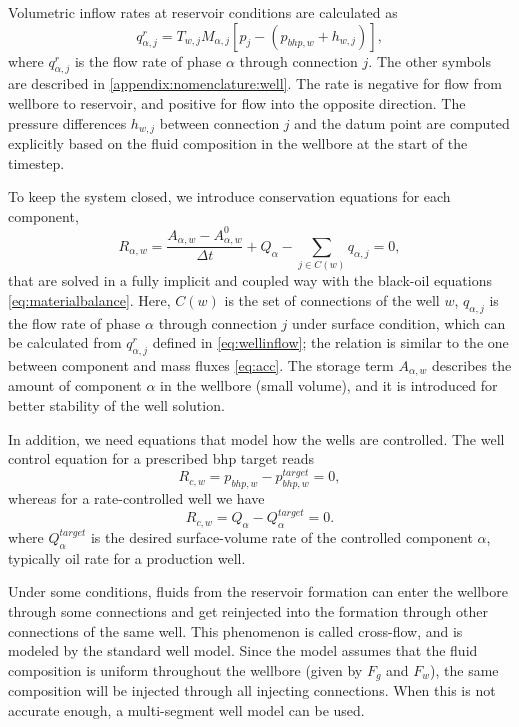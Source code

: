 Volumetric inflow rates at reservoir conditions are calculated as
\begin{equation}
q_{\alpha,j}^r = T_{w,j} M_{\alpha,j} [p_j - (p_{bhp,w} + h_{w,j})],
\label{eq:wellinflow}
\end{equation} 
where $q_{\alpha,j}^r$ is the flow rate of phase $\alpha$ through connection $j$. The
other symbols are described in \ref{appendix:nomenclature:well}.  The rate
is negative for flow from wellbore to reservoir, and positive for flow
into the opposite direction. The pressure differences $h_{w,j}$ between connection $j$ and
the datum point are computed explicitly based on the fluid composition in the wellbore at
the start of the timestep.

To keep the system closed, we introduce conservation equations for each component,
\begin{equation}
  \label{eq:conseq-swell}
R_{\alpha, w} = \frac{A_{\alpha, w} - A_{\alpha, w}^0}{\Delta t}  + Q_\alpha - \sum_{j\in C(w)} q_{\alpha, j} = 0,
\end{equation}
that are solved in a fully implicit and coupled way with the black-oil equations
\eqref{eq:materialbalance}.  Here, $C(w)$ is the set of connections of
the well $w$, $q_{\alpha,j}$ is the flow rate of phase $\alpha$
through connection $j$ under surface condition, which can be calculated from
$q_{\alpha,j}^r$ defined in \eqref{eq:wellinflow}; the relation is similar to the one
between component and mass fluxes \eqref{eq:acc}. The storage term $A_{\alpha, w}$
describes the amount of component $\alpha$ in the wellbore (small volume), and it is
introduced for better stability of the well solution.

In addition, we need equations that model how the wells are controlled.  The well control
{\revised equation for a prescribed bhp target reads}
\begin{equation}\label{eq:well-control-bhp}
R_{c, w} = p_{bhp, w} - p_{bhp, w}^{target} = 0,
\end{equation}
whereas for a rate-controlled well we have
\begin{equation}\label{eq:well-control-rate}
R_{c, w} = Q_\alpha - Q_\alpha^{target} = 0.
\end{equation}
where $Q_\alpha^{target}$ is the desired surface-volume rate of the
controlled component $\alpha$, typically oil rate for a production well.

Under some conditions, fluids from the reservoir formation can enter
the wellbore through some connections and get reinjected into the
formation through other connections of the same well. This phenomenon
is called cross-flow, and is modeled by the standard well model. Since
the model assumes that the fluid composition is uniform throughout the
wellbore (given by $F_g$ and $F_w$), the same composition will be
injected through all injecting connections. When this is not accurate
enough, a multi-segment well model can be used.

